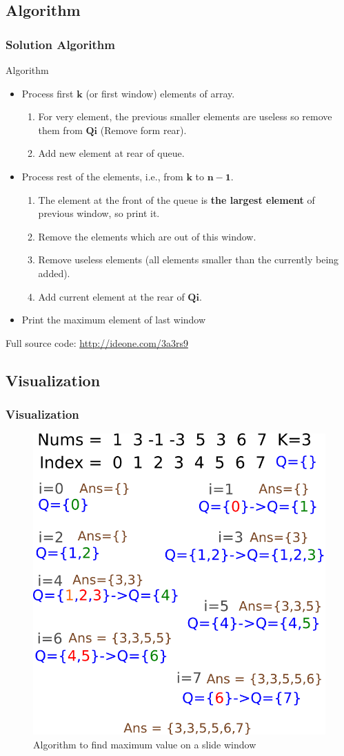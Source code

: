 \documentclass{beamer}
\begin{document}
\begin{frame}
\subsection{Algorithm}
\frametitle{ Solution Algorithm }
\begin{block}{Algorithm}
\begin{itemize}
	\item Process first $\mathbf{k}$ (or first window) elements of array.
	\begin{enumerate}
		\item For very element, the previous smaller elements are useless so remove them from $\mathbf{Qi}$ (Remove form rear).
		\item Add new element at rear of queue.
	\end{enumerate}
	\item  Process rest of the elements, i.e., from $\mathbf{k}$ to $\mathbf{n-1}$.
	\begin{enumerate}
		\item The element at the front of the queue is \textbf{the largest element} of previous window, so print it.
		\item Remove the elements which are out of this window.
		\item Remove useless elements (all elements smaller than the currently being added).
		\item Add current element at the rear of $\mathbf{Qi}$.
	\end{enumerate}
	\item Print the maximum element of last window
\end{itemize}
Full source code: \url{http://ideone.com/3a3rs9}
\end{block}
\end{frame}
\subsection{Visualization}
\begin{frame}
\frametitle{Visualization}
\begin{figure}
	\includegraphics[width=0.55\linewidth]{k_max.png}
	\caption{Algorithm to find maximum value on  a slide window}
\end{figure}
\end{frame}
\end{document}

